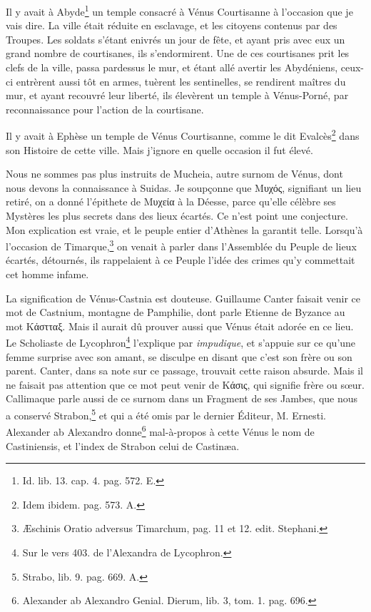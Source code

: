 \documentclass[a4paper, 18pt, oneside]{article}
\begin{document}
Il y avait à Abyde\footnote{Id. lib. 13. cap. 4. pag. 572. E.} un temple consacré à Vénus Courtisanne à l'occasion que je vais dire. La ville était réduite en esclavage, et les citoyens contenus par des Troupes. Les soldats s'étant enivrés un jour de fête, et ayant pris avec eux un grand nombre de courtisanes, ils s'endormirent. Une de ces courtisanes prit les clefs de la ville, passa pardessus le mur, et étant allé avertir les Abydéniens, ceux-ci entrèrent aussi tôt en armes, tuèrent les sentinelles, se rendirent maîtres du mur, et ayant recouvré leur liberté, ils élevèrent un temple à Vénus-Porné, par reconnaissance pour l'action de la courtisane.

Il y avait à Ephèse un temple de Vénus Courtisanne, comme le dit Evalcès\footnote{Idem ibidem. pag. 573. A.} dans son Histoire de cette ville. Mais j'ignore en quelle occasion il fut élevé.

Nous ne sommes pas plus instruits de Mucheia, autre surnom de Vénus, dont nous devons la connaissance à Suidas. Je soupçonne que Μυχός, signifiant un lieu retiré, on a donné l'épithete de Μυχεία à la Déesse, parce qu'elle célèbre ses Mystères les plus secrets dans des lieux écartés. Ce n'est point une conjecture. Mon explication est vraie, et le peuple entier d'Athènes la garantit telle. Lorsqu'à l'occasion de Timarque,\footnote{Æschinis Oratio adversus Timarchum, pag. 11 et 12. edit. Stephani.} on venait à parler dans l'Assemblée du Peuple de lieux écartés, détournés, ils rappelaient à ce Peuple l'idée des crimes qu'y commettait cet homme infame.

La signification de Vénus-Castnia est douteuse. Guillaume Canter faisait venir ce mot de Castnium, montagne de Pamphilie, dont parle Etienne de Byzance au mot Κάστταξ. Mais il aurait dû prouver aussi que Vénus était adorée en ce lieu. Le Scholiaste de Lycophron\footnote{Sur le vers 403. de l'Alexandra de Lycophron.} l'explique par \emph{impudique}, et s'appuie sur ce qu'une femme surprise avec son amant, se disculpe en disant que c'est son frère ou son parent. Canter, dans sa note sur ce passage, trouvait cette raison absurde. Mais il ne faisait pas attention que ce mot peut venir de Κάσις, qui signifie frère ou sœur. Callimaque parle aussi de ce surnom dans un Fragment de ses Jambes, que nous a conservé Strabon,\footnote{Strabo, lib. 9. pag. 669. A.} et qui a été omis par le dernier Éditeur, M. Ernesti. Alexander ab Alexandro donne\footnote{Alexander ab Alexandro Genial. Dierum, lib. 3, tom. 1. pag. 696.} mal-à-propos à cette Vénus le nom de Castiniensis, et l'index de Strabon celui de Castinæa.
\end{document}
